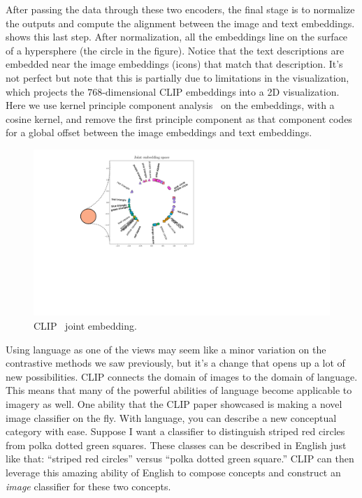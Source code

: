 After passing the data through these two encoders, the final stage is to normalize the outputs and compute the alignment between the image and text embeddings. \Fig{\ref{fig:vision_and_language:clip_shared_embedding}} shows this last step. After normalization, all the embeddings line on the surface of a hypersphere (the circle in the figure). Notice that the text descriptions are embedded near the image embeddings (icons) that match that description. It's not perfect but note that this is partially due to limitations in the visualization, which projects the $768$-dimensional CLIP embeddings into a 2D visualization. Here we use kernel principle component analysis~\cite{scholkopf1998nonlinear} on the embeddings, with a cosine kernel, and remove the first principle component as that component codes for a global offset between the image embeddings and text embeddings.
\begin{figure}[h]
    \centerline{
        \includegraphics[width=0.8\linewidth]{figures/vision_and_language/clip_shared_embedding.pdf}}
        \caption{CLIP~\cite{radford2021learning} joint embedding.}
        \label{fig:vision_and_language:clip_shared_embedding}
\end{figure}

Using language as one of the views may seem like a minor variation on the contrastive methods we saw previously, but it's a change that opens up a lot of new possibilities. CLIP connects the domain of images to the domain of language. This means that many of the powerful abilities of language become applicable to imagery as well. One ability that the CLIP paper showcased is making a novel image classifier on the fly. With language, you can describe a new conceptual category with ease. Suppose I want a classifier to distinguish striped red circles from polka dotted green squares. These classes can be described in English just like that: ``striped red circles'' versus ``polka dotted green square.'' CLIP can then leverage this amazing ability of English to compose concepts and construct an \textit{image} classifier for these two concepts. 

